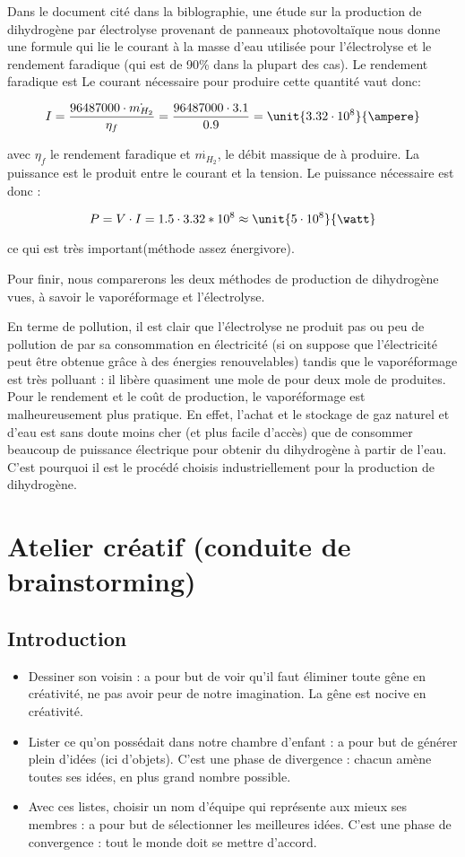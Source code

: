 Dans le document cité dans la biblographie\cite{electrolyse}, une étude sur la production
de dihydrogène par électrolyse provenant de panneaux photovoltaïque nous
donne une formule qui lie le courant à la masse d'eau utilisée pour
l'électrolyse et le rendement faradique (qui est de 90\% dans la plupart des cas).
Le rendement faradique est Le courant nécessaire pour produire cette quantité vaut donc:

$$I = \frac{96487000\cdot {\dot{m_{H_2}}}}{\eta_f} = \frac{96487000\cdot 3.1}{0.9} =  \unit{3.32\cdot 10^8}{\ampere}$$

avec $\eta_f$ le rendement faradique et $\dot{m_{H_2}}$, le débit massique
de  à produire. La puissance est le produit entre le courant et la
tension. Le puissance nécessaire est donc :

$$P = V\cdot I = 1.5\cdot 3.32*10^8 \approx \unit{5\cdot 10^8}{\watt}$$

ce qui est très important(méthode assez énergivore).

Pour finir, nous comparerons les deux méthodes de production de
dihydrogène vues, à savoir le vaporéformage et l'électrolyse.

En terme de pollution, il est clair que l'électrolyse ne produit
pas ou peu de pollution de par sa consommation en électricité
(si on suppose que l'électricité peut être obtenue grâce à des énergies renouvelables)
tandis que le vaporéformage est très polluant : il libère quasiment une mole de 
pour deux mole de  produites. Pour le rendement et le coût de production,
le vaporéformage est malheureusement plus pratique. En effet, l'achat et le stockage
de gaz naturel et d'eau est sans doute moins cher (et plus facile d'accès) que
de consommer beaucoup de puissance électrique pour obtenir du dihydrogène à partir
de l'eau. C'est pourquoi il est le procédé choisis industriellement pour la production
de dihydrogène.

\section{Atelier créatif (conduite de brainstorming)}
\subsection{Introduction}
\begin{itemize}
	\item Dessiner son voisin : a pour but de voir qu'il faut éliminer toute gêne en
	créativité, ne pas avoir peur de notre imagination. La gêne est nocive en créativité.
	\item Lister ce qu'on possédait dans notre chambre d'enfant : a pour but de générer
	plein d'idées (ici d'objets). C'est une phase de divergence : chacun amène toutes
	ses idées, en plus grand nombre possible.
	\item Avec ces listes, choisir un nom d'équipe qui représente aux mieux ses membres
	: a pour but de sélectionner les meilleures idées. C'est une phase de convergence :
	tout le monde doit se mettre d'accord.
\end{itemize}

